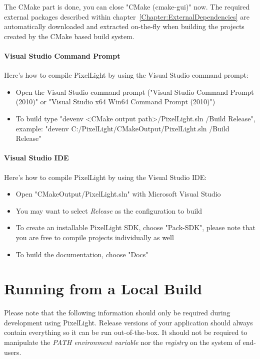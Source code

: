 The CMake part is done, you can close "CMake (cmake-gui)" now. The required external packages described within chapter~\ref{Chapter:ExternalDependencies} are automatically downloaded and extracted on-the-fly when building the projects created by the CMake based build system.


\paragraph{Visual Studio Command Prompt}
Here's how to compile PixelLight by using the Visual Studio command prompt:
\begin{itemize}
\item{Open the Visual Studio command prompt ("Visual Studio Command Prompt (2010)" or "Visual Studio x64 Win64 Command Prompt (2010)")}
\item{To build type "devenv <CMake output path>/PixelLight.sln /Build Release", example: "devenv C:/PixelLight/CMakeOutput/PixelLight.sln /Build Release"}
\end{itemize}


\paragraph{Visual Studio \ac{IDE}}
Here's how to compile PixelLight by using the Visual Studio \ac{IDE}:
\begin{itemize}
\item{Open "CMakeOutput/PixelLight.sln" with Microsoft Visual Studio}
\item{You may want to select \emph{Release} as the configuration to build}
\item{To create an installable PixelLight \ac{SDK}, choose "Pack-SDK", please note that you are free to compile projects individually as well}
\item{To build the documentation, choose "Docs"}
\end{itemize}




\section{Running from a Local Build}
Please note that the following information should only be required during development using PixelLight. Release versions of your application should always contain everything so it can be run out-of-the-box. It should not be required to manipulate the \emph{PATH environment variable} nor the \emph{registry} on the system of end-users.


